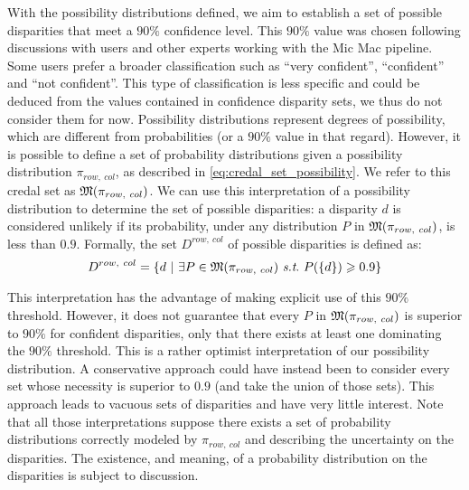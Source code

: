 
With the possibility distributions defined, we aim to establish a set of possible disparities that meet a \(90\%\) confidence level. This \( 90\%\) value was chosen following discussions with users and other experts working with the Mic Mac pipeline. Some users prefer a broader classification such as ``very confident'', ``confident'' and ``not confident''. This type of classification is less specific and could be deduced from the values contained in confidence disparity sets, we thus do not consider them for now.
Possibility distributions represent degrees of possibility, which are different from probabilities (or a \( 90\%\) value in that regard). However, it is possible to define a set of probability distributions given a possibility distribution \( \pi_{row,~col} \), as described in \cref{eq:credal_set_possibility}. We refer to this credal set as \( \mathfrak{M}(\pi_{row,~col}) \). We can use this interpretation of a possibility distribution to determine the set of possible disparities: a disparity \( d \) is considered unlikely if its probability, under any distribution \( P \) in \( \mathfrak{M}(\pi_{row,~col}) \), is less than \(0.9\). Formally, the set \( D^{row,~col} \) of possible disparities is defined as:
\begin{equation}
    D^{row,~col}=\{ d~|~\exists P\in\M(\pi_{row,~col})~\st~P(\{d\})\geqslant 0.9 \}\label{eq:disparity_possible_set_with_proba}
\end{equation}

This interpretation has the advantage of making explicit use of this \( 90\%\) threshold. However, it does not guarantee that every \( P \) in \( \mathfrak{M}(\pi_{row,~col}) \) is superior to \( 90\%\) for confident disparities, only that there exists at least one dominating the \( 90\%\) threshold. This is a rather optimist interpretation of our possibility distribution. A conservative approach could have instead been to consider every set whose necessity is superior to \(0.9\) (and take the union of those sets). This approach leads to vacuous sets of disparities and have very little interest. Note that all those interpretations suppose there exists a set of probability distributions correctly modeled by \( \pi_{row,~col} \) and describing the uncertainty on the disparities. The existence, and meaning, of a probability distribution on the disparities is subject to discussion. 

